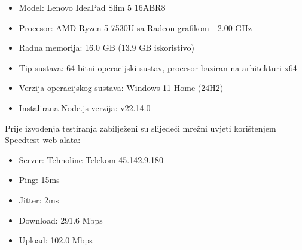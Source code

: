 \bigskip

\begin{itemize}
    \item Model: Lenovo IdeaPad Slim 5 16ABR8
    \item Procesor: AMD Ryzen 5 7530U sa Radeon grafikom - 2.00 GHz
    \item Radna memorija: 16.0 GB (13.9 GB iskoristivo)
    \item Tip sustava: 64-bitni operacijski sustav, procesor baziran na arhitekturi x64
    \item Verzija operacijskog sustava: Windows 11 Home (24H2)
    \item Instalirana Node.js verzija: v22.14.0
\end{itemize}

Prije izvođenja testiranja zabilježeni su slijedeći mrežni uvjeti korištenjem Speedtest web alata:

\begin{itemize}
    \item Server: Tehnoline Telekom 45.142.9.180
    \item Ping: 15ms
    \item Jitter: 2ms
    \item Download: 291.6 Mbps
    \item Upload: 102.0 Mbps
\end{itemize}
